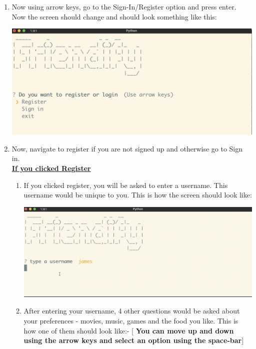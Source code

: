 \documentclass[11pt]{report}
\begin{document}
\begin{enumerate}
    \item Now using arrow keys, go to the Sign-In/Register option and press enter. Now the screen should change and should look something like this:
    
    \begin{center}
        \includegraphics[scale = .31]{Images/sign_in_register.png}
    \end{center}
    
    
    \item Now, navigate to register if you are not signed up and otherwise go to Sign in. \\
    
    
    {\bf \underline{{\Large If you clicked Register}}}
    
     \begin{enumerate}
         \item If you clicked register, you will be asked to enter a username. This username would be unique to you. This is how the screen should look like:
         
           \begin{center}
             \includegraphics[scale = .25]{Images/register-name-q.png}
            \end{center}
            
        \item After entering your username, 4 other questions would be asked about your preferences - movies, music, games and the food you like. This is how one of them should look like:- [\textbf{ You can move up and down using the arrow keys and select an option using the space-bar}]
        

\end{enumerate}
\end{enumerate}
\end{document}
